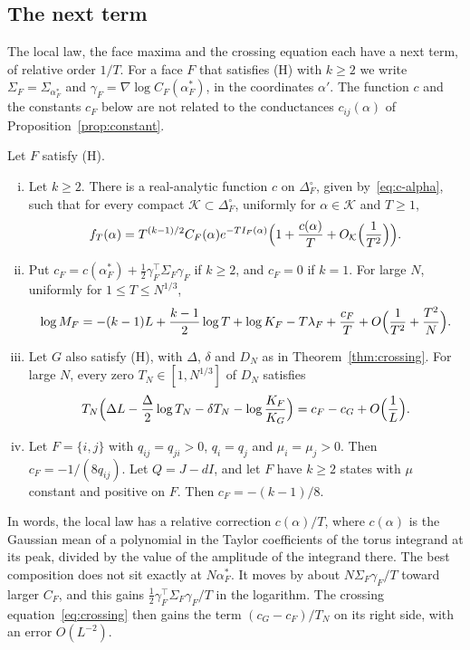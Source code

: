 \subsection{The next term}\label{sec:nextterm}

The local law, the face maxima and the crossing equation each have a next term, of relative
order $1/T$. For a face $F$ that satisfies (H) with $k\ge2$ we write
$\Sigma_F=\Sigma_{\alpha^*_F}$ and $\gamma_F=\nabla\log C_F(\alpha^*_F)$, in the coordinates
$\alpha'$. The function $c$ and the constants $c_F$ below are not related to the conductances
$c_{ij}(\alpha)$ of Proposition~\ref{prop:constant}.

\begin{proposition}\label{prop:nextterm}\label{rem:nextterm}
Let $F$ satisfy \textup{(H)}.
\begin{enumerate}[(i)]
\item Let $k\ge2$. There is a real-analytic function $c$ on $\Delta_F^\circ$, given
by~\eqref{eq:c-alpha}, such that for every compact $\mathcal K\subset\Delta_F^\circ$, uniformly
for $\alpha\in\mathcal K$ and $T\ge1$,
\[
f_T(\alpha)=T^{(k-1)/2}C_F(\alpha)e^{-TI_F(\alpha)}
\Bigl(1+\frac{c(\alpha)}T+O_{\mathcal K}\Bigl(\frac1{T^2}\Bigr)\Bigr).
\]
\item Put $c_F=c(\alpha^*_F)+\frac12\gamma_F^\top\Sigma_F\gamma_F$ if $k\ge2$, and $c_F=0$ if
$k=1$. For large $N$, uniformly for $1\le T\le N^{1/3}$,
\begin{equation}\label{eq:logmaxnext}
\log M_F=-(k-1)L+\frac{k-1}2\log T+\log K_F-T\lambda_F+\frac{c_F}T
+O\Bigl(\frac1{T^2}+\frac{T^2}N\Bigr).
\end{equation}
\item Let $G$ also satisfy \textup{(H)}, with $\Delta$, $\delta$ and $D_N$ as in
Theorem~\ref{thm:crossing}. For large $N$, every zero $T_N\in[1,N^{1/3}]$ of $D_N$ satisfies
\begin{equation}\label{eq:crossingnext}
T_N\Bigl(\Delta L-\frac\Delta2\log T_N-\delta T_N-\log\frac{K_F}{K_G}\Bigr)
=c_F-c_G+O\Bigl(\frac1L\Bigr).
\end{equation}
\item Let $F=\{i,j\}$ with $q_{ij}=q_{ji}>0$, $q_i=q_j$ and $\mu_i=\mu_j>0$. Then
$c_F=-1/(8q_{ij})$. Let $Q=J-dI$, and let $F$ have $k\ge2$ states with $\mu$ constant and
positive on $F$. Then $c_F=-(k-1)/8$.
\end{enumerate}
\end{proposition}

In words, the local law has a relative correction $c(\alpha)/T$, where $c(\alpha)$ is the
Gaussian mean of a polynomial in the Taylor coefficients of the torus integrand at its peak,
divided by the value of the amplitude of the integrand there. The best composition does not sit exactly at
$N\alpha^*_F$. It moves by about $N\Sigma_F\gamma_F/T$ toward larger $C_F$, and this gains
$\frac12\gamma_F^\top\Sigma_F\gamma_F/T$ in the logarithm. The crossing equation~\eqref{eq:crossing}
then gains the term $(c_G-c_F)/T_N$ on its right side, with an error $O(L^{-2})$.

